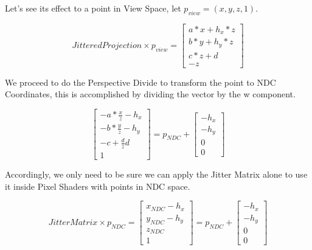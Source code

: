\documentclass{cslthse-msc}
\begin{document}
\begin{appendices}
Let’s see its effect to a point in View Space, let $p_{view}=(x,y,z,1)$.

\begin{equation}
	JitteredProjection\times p_{view} = \begin{bmatrix*}
	a*x+h_x*z \\
	b*y+h_y*z \\
	c*z+d \\
	-z
	\end{bmatrix*}
\end{equation}

We proceed to do the Perspective Divide to transform the point to NDC Coordinates, this is accomplished by dividing the vector by the w component.

\begin{equation}
\begin{bmatrix*}
-a*\frac{x}{z}-h_x \\
-b*\frac{y}{z}-h_y \\
-c+\frac{d}{z}d \\
1
\end{bmatrix*} = p_{NDC} + \begin{bmatrix*}
-h_x \\
-h_y \\
0 \\
0
\end{bmatrix*}
\end{equation}

Accordingly, we only need to be sure we can apply the Jitter Matrix alone to use it inside Pixel Shaders with points in NDC space. 

\begin{equation}
	JitterMatrix\times p_{NDC} = \begin{bmatrix*}
	x_{NDC}-h_x \\
	y_{NDC}-h_y \\
	z_{NDC} \\
	1
	\end{bmatrix*} = p_{NDC} + \begin{bmatrix*}
	-h_x \\
	-h_y \\
	0 \\
	0
	\end{bmatrix*}
\end{equation}

\end{appendices}
\end{document}
